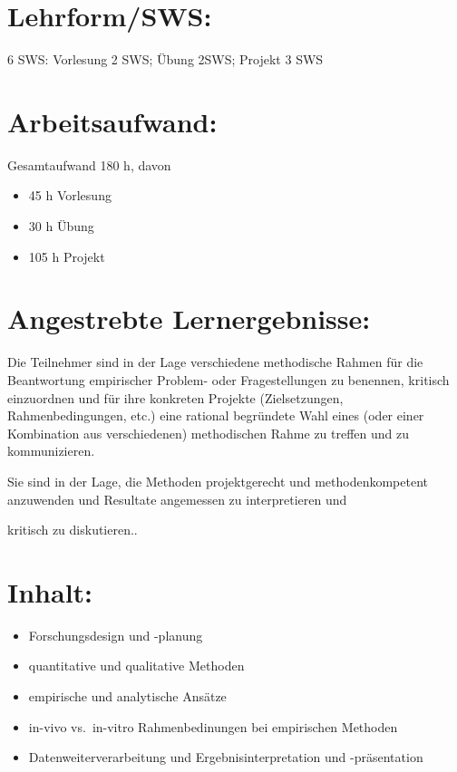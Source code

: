 \section*{Lehrform/SWS:}\label{lehrformsws-9}

6 SWS: Vorlesung 2 SWS; Übung 2SWS; Projekt 3 SWS

\section*{Arbeitsaufwand:}\label{arbeitsaufwand-9}

Gesamtaufwand 180 h, davon

\begin{itemize}
\item
  45 h Vorlesung
\item
  30 h Übung
\item
  105 h Projekt
\end{itemize}

\section*{Angestrebte
Lernergebnisse:}\label{angestrebte-lernergebnisse-9}

Die Teilnehmer sind in der Lage verschiedene methodische Rahmen für die
Beantwortung empirischer Problem- oder Fragestellungen zu benennen,
kritisch einzuordnen und für ihre konkreten Projekte (Zielsetzungen,
Rahmenbedingungen, etc.) eine rational begründete Wahl eines (oder einer
Kombination aus verschiedenen) methodischen Rahme zu treffen und zu
kommunizieren.

Sie sind in der Lage, die Methoden projektgerecht und methodenkompetent
anzuwenden und Resultate angemessen zu interpretieren und

kritisch zu diskutieren..

\section*{Inhalt:}\label{inhalt-9}

\begin{itemize}
\item
  Forschungsdesign und -planung
\item
  quantitative und qualitative Methoden
\item
  empirische und analytische Ansätze
\item
  in-vivo vs.~in-vitro Rahmenbedinungen bei empirischen Methoden
\item
  Datenweiterverarbeitung und Ergebnisinterpretation und -präsentation
\end{itemize}

